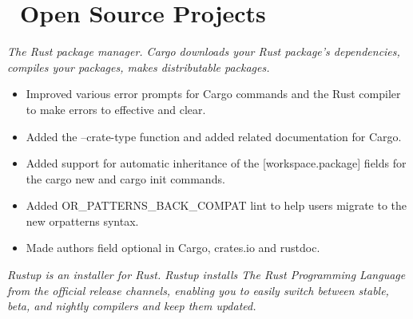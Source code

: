 \documentclass{resume}
\newcommand{\en}[1]{#1}
\newcommand{\zh}[1]{}
\begin{document}
\section{\faGithubAlt\ \en{Open Source Projects}\zh{开源项目}}
\en{}
\zh{\datedsubsection{\textbf{Cargo \& Rust - 活跃贡献者}}{{\href{https://github.com/search?q=repo:rust-lang/cargo+repo:rust-lang/rust+author:hi-rustin&type=commits}{219+ commits}}}}
\en{\textsl{The Rust package manager. Cargo downloads your Rust package’s dependencies, compiles your packages, makes distributable packages.}}
\zh{\textsl{Rust 包管理器，Cargo 下载 Rust 包的依赖，编译包，制作可分发的包。}}

\begin{itemize}
      \item \en{Improved various error prompts for Cargo commands and the Rust compiler to make errors to effective and clear.}
            \zh{改善了大量 Cargo 命令和 Rust 编译器的错误提示，让错误更有效更清晰。}
      \item \en{Added the --crate-type function and added related documentation for Cargo.}
            \zh{为 Cargo 添加了 --crate-type 功能和相关文档。}
      \item \en{Added support for automatic inheritance of the [workspace.package] fields for the cargo new and cargo init commands.}
            \zh{为 cargo new 和 cargo init 命令支持了 [workspace.package] 字段自动继承。}
      \item \en{Added OR\_PATTERNS\_BACK\_COMPAT lint to help users migrate to the new or\-patterns syntax.}
            \zh{添加了 OR\_PATTERNS\_BACK\_COMPAT lint 来帮助用户迁移至新的 or\-patterns 语法。}
      \item \en{Made authors field optional in Cargo, crates.io and rustdoc.}
            \zh{使 authors 字段在 Cargo、crates.io 和 rustdoc 中可选。}
\end{itemize}

\en{}
\zh{\datedsubsection{\textbf{Rustup - 活跃维护者}}{{\href{https://github.com/rust-lang/rustup/commits?author=hi-rustin}{110+ commits}}}}
\en{\textsl{Rustup is an installer for Rust. Rustup installs The Rust Programming Language from the official release channels, enabling you to easily switch between stable, beta, and nightly compilers and keep them updated.}}
\zh{\textsl{Rustup 是 Rust 的安装器。Rustup 从官方发布渠道安装 Rust 编程语言，使用户可以轻松地在稳定版、测试版和夜版编译器之间切换并保持更新。}}
\end{document}
